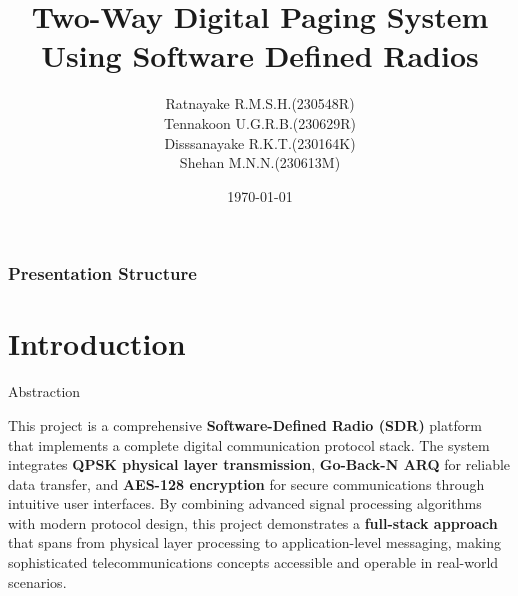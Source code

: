 \documentclass[11pt]{beamer}
\title[EN2130 Communication Design Project]{Two-Way Digital Paging System Using Software
	Defined Radios}
\author[BellLabz]{Ratnayake R.M.S.H.(230548R)\\
	Tennakoon U.G.R.B.(230629R)\\
	Disssanayake R.K.T.(230164K)\\
	Shehan M.N.N.(230613M)}
\institute[]{Department of Electronic \& Telecommunication Engineering\\ University of Moratuwa, Sri Lanka}
\date{\today}
\begin{document}
	
	\begin{frame}
		\titlepage
	\end{frame}
	
	\begin{frame}
		\frametitle{Presentation Structure}
		\tableofcontents
	\end{frame}
	
	\section{Introduction}
	\begin{frame}{Abstraction}
		
\justifying
This project is a comprehensive \textbf{Software-Defined Radio (SDR)} platform that implements a complete digital communication protocol stack. The system integrates \textbf{QPSK physical layer transmission}, \textbf{Go-Back-N ARQ} for reliable data transfer, and \textbf{AES-128 encryption} for secure communications through intuitive user interfaces. By combining advanced signal processing algorithms with modern protocol design, this project demonstrates a \textbf{full-stack approach} that spans from physical layer processing to application-level messaging, making sophisticated telecommunications concepts accessible and operable in real-world scenarios.
	
	\end{frame}
\end{document}

